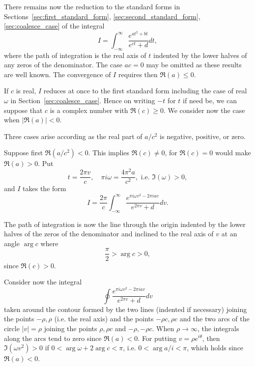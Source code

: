 \documentclass[12pt]{article}
\theoremstyle{remark}
\begin{document}
There remains now the reduction to the standard forms in Sections~\ref{sec:first_standard_form}, \ref{sec:second_standard_form}, \ref{sec:coalesce_case} of the integral
\begin{equation}\label{eq:general_integral}
I = \int_{-\infty}^\infty \frac{e^{at^2 + bt}}{e^{ct} + d} dt,
\end{equation}
where the path of integration is the real axis of $t$ indented by the lower halves of any zeros of the denominator. The case $ac = 0$ may be omitted as these results are well known. The convergence of $I$ requires then $\Re(a) \leq 0$.

If $c$ is real, $I$ reduces at once to the first standard form including the case of real $\omega$ in Section~\ref{sec:coalesce_case}. Hence on writing $-t$ for $t$ if need be, we can suppose that $c$ is a complex number with $\Re(c) \geq 0$. We consider now the case when $|\Re(a)| < 0$.

Three cases arise according as the real part of $a/c^2$ is negative, positive, or zero.

Suppose first $\Re(a/c^2) < 0$. This implies $\Re(c) \neq 0$, for $\Re(c) = 0$ would make $\Re(a) > 0$. Put
\begin{equation}\label{eq:substitution1}
t = \frac{2\pi v}{c}, \quad \pi i\omega = \frac{4\pi^2 a}{c^2}, \text{ i.e. } \Im(\omega) > 0,
\end{equation}
and $I$ takes the form
\begin{equation}\label{eq:reduced_form1}
I = \frac{2\pi}{c} \int_{-\infty}^\infty \frac{e^{\pi i\omega v^2 - 2\pi iav}}{e^{2\pi v} + d} dv.
\end{equation}

The path of integration is now the line through the origin indented by the lower halves of the zeros of the denominator and inclined to the real axis of $v$ at an angle $\arg c$ where
\begin{equation}\label{eq:angle_constraint}
\frac{\pi}{2} > \arg c > 0,
\end{equation}
since $\Re(c) > 0$.

Consider now the integral
\begin{equation}\label{eq:contour_deformation}
\oint \frac{e^{\pi i\omega v^2 - 2\pi iav}}{e^{2\pi v} + d} dv
\end{equation}
taken around the contour formed by the two lines (indented if necessary) joining the points $-\rho, \rho$ (i.e. the real axis) and the points $-\rho c, \rho c$ and the two arcs of the circle $|v| = \rho$ joining the points $\rho, \rho c$ and $-\rho, -\rho c$. When $\rho \to \infty$, the integrals along the arcs tend to zero since $\Re(a) < 0$. For putting $v = \rho e^{i\theta}$, then $\Im(\omega v^2) > 0$ if $0 < \arg \omega + 2\arg c < \pi$, i.e. $0 < \arg a/i < \pi$, which holds since $\Re(a) < 0$.
\end{document}
